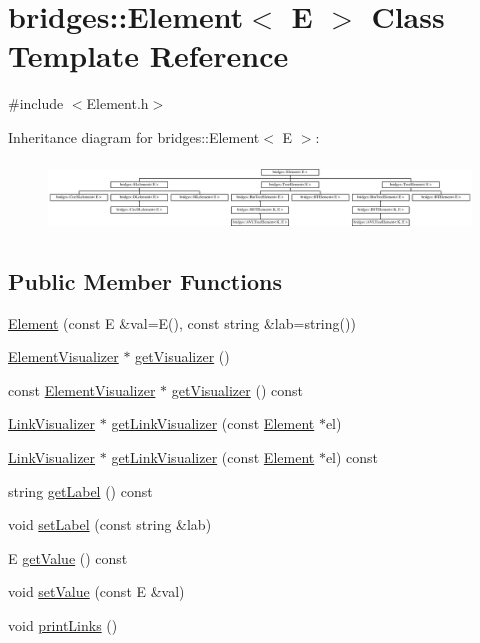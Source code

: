 \hypertarget{classbridges_1_1_element}{}\section{bridges\+:\+:Element$<$ E $>$ Class Template Reference}
\label{classbridges_1_1_element}


{\ttfamily \#include $<$Element.\+h$>$}

Inheritance diagram for bridges\+:\+:Element$<$ E $>$\+:\begin{figure}[H]
\begin{center}
\leavevmode
\includegraphics[height=1.886792cm]{classbridges_1_1_element}
\end{center}
\end{figure}
\subsection*{Public Member Functions}
\begin{DoxyCompactItemize}
\item 
\hyperlink{classbridges_1_1_element_abc7131584142ea48faf3b7a8033d1fef}{Element} (const E \&val=E(), const string \&lab=string())
\item 
\hyperlink{classbridges_1_1_element_visualizer}{Element\+Visualizer} $\ast$ \hyperlink{classbridges_1_1_element_a358f350ae6e33d55c4ac9f9213d0c5bc}{get\+Visualizer} ()
\item 
const \hyperlink{classbridges_1_1_element_visualizer}{Element\+Visualizer} $\ast$ \hyperlink{classbridges_1_1_element_a7672ce8623ab561d457b4a91e19c4e53}{get\+Visualizer} () const 
\item 
\hyperlink{classbridges_1_1_link_visualizer}{Link\+Visualizer} $\ast$ \hyperlink{classbridges_1_1_element_aa8dd91d04c22c697f7c500a18642282f}{get\+Link\+Visualizer} (const \hyperlink{classbridges_1_1_element}{Element} $\ast$el)
\item 
\hyperlink{classbridges_1_1_link_visualizer}{Link\+Visualizer} $\ast$ \hyperlink{classbridges_1_1_element_a27567b3dd7ddce9217ca9958d1a03214}{get\+Link\+Visualizer} (const \hyperlink{classbridges_1_1_element}{Element} $\ast$el) const 
\item 
string \hyperlink{classbridges_1_1_element_aa5e02165249d5d55066132d3128cb6a8}{get\+Label} () const 
\item 
void \hyperlink{classbridges_1_1_element_a22313b74452175d07650168a701daa99}{set\+Label} (const string \&lab)
\item 
E \hyperlink{classbridges_1_1_element_a20290b80dca1c052d9fdb71abf4f0b5e}{get\+Value} () const 
\item 
void \hyperlink{classbridges_1_1_element_a737cb19281b6aa45a5a1dc9d592dad93}{set\+Value} (const E \&val)
\item 
void \hyperlink{classbridges_1_1_element_ae6f773c7222ff3a37c402e5e1f413c66}{print\+Links} ()
\end{DoxyCompactItemize}
